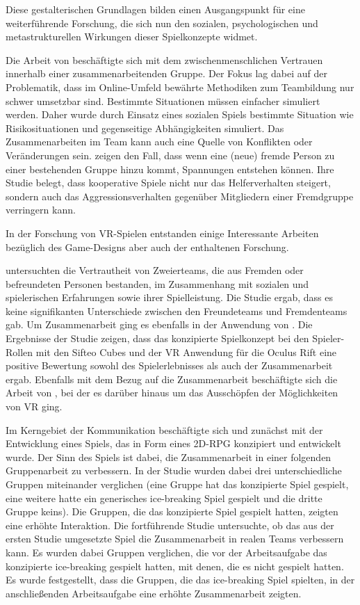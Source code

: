 Diese gestalterischen Grundlagen bilden einen Ausgangspunkt für eine weiterführende Forschung, die sich nun den sozialen, psychologischen und metastrukturellen Wirkungen dieser Spielkonzepte widmet.

Die Arbeit von \cite{depping_trust_2016} beschäftigte sich mit dem zwischenmenschlichen Vertrauen innerhalb einer zusammenarbeitenden Gruppe. Der Fokus lag dabei auf der Problematik, dass im Online-Umfeld bewährte Methodiken zum Teambildung nur schwer umsetzbar sind. Bestimmte Situationen müssen einfacher simuliert werden. Daher wurde durch Einsatz eines sozialen Spiels bestimmte Situation wie Risikosituationen und gegenseitige Abhängigkeiten simuliert. Das Zusammenarbeiten im Team kann auch eine Quelle von Konflikten oder Veränderungen sein. \cite{velez_ingroup_2014} zeigen den Fall, dass wenn eine (neue) fremde Person zu einer bestehenden Gruppe hinzu kommt, Spannungen entstehen können. Ihre Studie belegt,  dass kooperative Spiele nicht nur das Helferverhalten steigert, sondern auch das Aggressionsverhalten gegenüber Mitgliedern einer Fremdgruppe verringern kann.

In der Forschung von \ac{VR}-Spielen entstanden einige Interessante Arbeiten bezüglich des Game-Designs aber auch der enthaltenen Forschung.

\cite{karaosmanoglu_playing_2023} untersuchten die Vertrautheit von Zweierteams, die aus Fremden oder befreundeten Personen bestanden, im Zusammenhang mit sozialen und spielerischen Erfahrungen sowie ihrer Spielleistung. Die Studie ergab, dass es keine signifikanten Unterschiede zwischen den Freundeteams und Fremdenteams gab. Um Zusammenarbeit ging es ebenfalls in der Anwendung von \cite{sajjadi_maze_2014}. Die Ergebnisse der Studie zeigen, dass das konzipierte Spielkonzept bei den Spieler-Rollen mit den Sifteo Cubes und der VR Anwendung für die Oculus Rift eine positive Bewertung sowohl des Spielerlebnisses als auch der Zusammenarbeit ergab. Ebenfalls mit dem Bezug auf die Zusammenarbeit beschäftigte sich die Arbeit von \cite{smilovitch_birdquestvr_2019}, bei der es darüber hinaus um das Ausschöpfen der Möglichkeiten von \ac{VR} ging.

Im Kerngebiet der Kommunikation beschäftigte sich \cite{nasir_cooperative_2013} und \cite{nasir_effect_2015} zunächst mit der Entwicklung eines  Spiels, das in Form eines 2D-\ac{RPG} konzipiert und entwickelt wurde. Der Sinn des Spiels ist dabei, die Zusammenarbeit in einer folgenden Gruppenarbeit zu verbessern. In der Studie wurden dabei drei unterschiedliche Gruppen miteinander verglichen (eine Gruppe hat das konzipierte Spiel gespielt, eine weitere hatte ein generisches ice-breaking Spiel gespielt und die dritte Gruppe keins). Die Gruppen, die das konzipierte Spiel gespielt hatten, zeigten eine erhöhte Interaktion. Die fortführende Studie untersuchte, ob das aus der ersten Studie umgesetzte Spiel die Zusammenarbeit in realen Teams verbessern kann. Es wurden dabei Gruppen verglichen, die vor der Arbeitsaufgabe das konzipierte ice-breaking gespielt hatten, mit denen, die es nicht gespielt hatten. Es wurde festgestellt, dass die Gruppen, die das ice-breaking Spiel spielten, in der anschließenden Arbeitsaufgabe eine erhöhte Zusammenarbeit zeigten.

